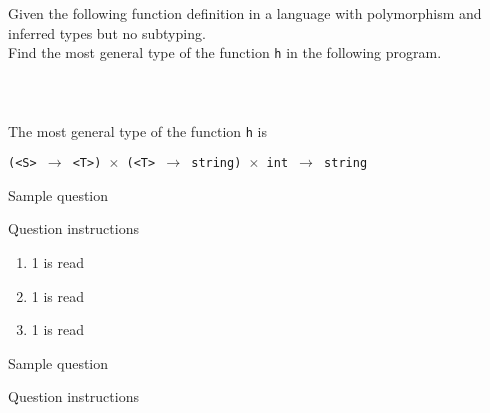 \documentclass[11pt]{exam}
\begin{document}
\begin{questions}

      \question Given the following function definition in a language
        with polymorphism and inferred types but no subtyping.\\
        Find the most general type of the function {\tt h} in the following program.
        {\tt
\begin{lstlisting}

\end{lstlisting}
        }


	\begin{framed}

            The most general type of the function {\tt h} is 
            
            {\tt (<S> $\to$ <T>) $\times$ (<T> $\to$ string) $\times$ int $\to$ string}

	\end{framed}


	\question Sample question

	Question instructions

	\begin{framed}


	\end{framed}

        \begin{enumerate}[label=(\roman*)]
            \item 1 is read
                \begin{framed}
                \end{framed}
            \item 1 is read
                \begin{framed}
                \end{framed}
            \item 1 is read
                \begin{framed}
                \end{framed}
        \end{enumerate}


	\question Sample question


	\quad

	Question instructions

	\begin{framed}


	\end{framed}

\end{questions}
\end{document}
